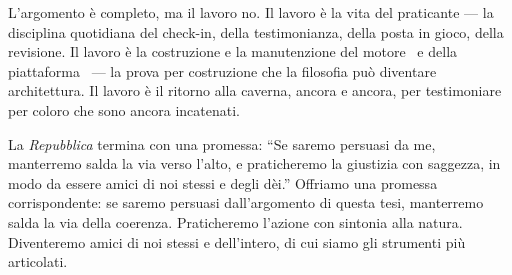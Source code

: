 L'argomento \`e completo, ma il lavoro no. Il lavoro \`e la vita del
praticante --- la disciplina quotidiana del check-in, della testimonianza,
della posta in gioco, della revisione. Il lavoro \`e la costruzione e la
manutenzione del motore \physis\ e della piattaforma \praxis\ --- la
prova per costruzione che la filosofia pu\`o diventare architettura. Il
lavoro \`e il ritorno alla caverna, ancora e ancora, per testimoniare per
coloro che sono ancora incatenati.

La \emph{Repubblica} termina con una promessa: ``Se saremo persuasi da me,
manterremo salda la via verso l'alto, e praticheremo la giustizia con
saggezza, in modo da essere amici di noi stessi e degli d\`ei.''
Offriamo una promessa corrispondente: se saremo persuasi dall'argomento
di questa tesi, manterremo salda la via della coerenza. Praticheremo
l'azione con sintonia alla natura. Diventeremo amici di noi stessi e
dell'intero, di cui siamo gli strumenti pi\`u articolati.
